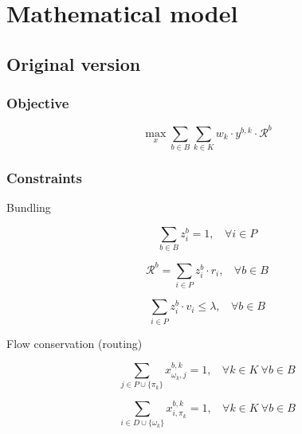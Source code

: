 \documentclass[12pt ]{article}
\begin{document}
\setcounter{secnumdepth}{0} %

\section{Mathematical model}

\subsection{Original version}
\subsubsection{Objective}

\begin{equation}
	\max_x \sum_{ b \in B} \sum_{k \in K} w_k \cdot y^{b,k} \cdot \mathcal{R}^b
	\label{eq:maxExpectedReward}	
\end{equation}
\vspace{0.5cm}

\subsubsection{Constraints}


Bundling

\begin{equation}
	\sum_{ b \in B} z_{i}^{b} = 1,~~~~\forall i \in P
	\label{eq:taskMembership}
\end{equation}

\begin{equation}
	\mathcal{R}^b = \sum_{ i \in P} z_{i}^{b} \cdot r_i,~~~~\forall b \in B
	\label{eq:bundleReward}
\end{equation}

\begin{equation}
	\sum_{ i \in P} z_{i}^{b} \cdot v_i \le \lambda,~~~~\forall b \in B
	\label{eq:volThreshold}
\end{equation}


\noindent Flow conservation (routing)

\begin{equation}
	\sum_{ j \in P \cup \{ \pi_k \} } x_{\omega_k, j}^{b, k} = 1,~~~~\forall k \in K ~\forall b \in B	
	\label{eq:flowBegin}
\end{equation}

\begin{equation}
	\sum_{ i \in D \cup \{\omega_k\} } x_{i,\pi_k}^{b,k} = 1,~~~~\forall k \in K ~\forall b \in B	
	\label{eq:flowEnd}
\end{equation}
\end{document}
